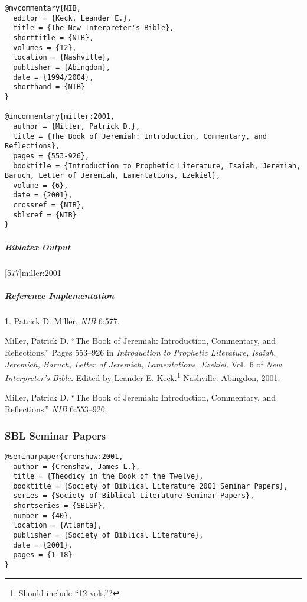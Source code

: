 \documentclass[a4paper]{article}
\newenvironment{biboutput}{%
  \subparagraph{Biblatex Output}
}{\color{black}}
\newenvironment{refimp}{%
  \subparagraph{Reference Implementation}
  \color{reference-colour}
  \rm
}{\par\color{black}}
\begin{document}
\begin{lstlisting}
@mvcommentary{NIB,
  editor = {Keck, Leander E.},
  title = {The New Interpreter's Bible},
  shorttitle = {NIB},
  volumes = {12},
  location = {Nashville},
  publisher = {Abingdon},
  date = {1994/2004},
  shorthand = {NIB}
}

@incommentary{miller:2001,
  author = {Miller, Patrick D.},
  title = {The Book of Jeremiah: Introduction, Commentary, and Reflections},
  pages = {553-926},
  booktitle = {Introduction to Prophetic Literature, Isaiah, Jeremiah, Baruch, Letter of Jeremiah, Lamentations, Ezekiel},
  volume = {6},
  date = {2001},
  crossref = {NIB},
  sblxref = {NIB}
}
\end{lstlisting}

\begin{biboutput}
  [577]{miller:2001}
  \toggletrue{fullbibrefs}
  \togglefalse{fullbibrefs}
\end{biboutput}

\begin{refimp}
  \hspace*{\bibindent}1. Patrick D. Miller, \emph{NIB} 6:577.

  \hangindent\bibindent Miller, Patrick D. “The Book of Jeremiah:
  Introduction, Commentary, and Reflections.” Pages 553–926 in
  \emph{Introduction to Prophetic Literature, Isaiah, Jeremiah, Baruch, Letter
  of Jeremiah, Lamentations, Ezekiel.} Vol.~6 of \emph{New Interpreter’s
  Bible.} Edited by Leander E. Keck.\footnote{Should include “12 vols.”?}
  Nashville: Abingdon, 2001.

  \hangindent\bibindent Miller, Patrick D. “The Book of Jeremiah:
  Introduction, Commentary, and Reflections.” \emph{NIB} 6:553–926.

\end{refimp}

\subsubsection{SBL Seminar Papers}

\begin{lstlisting}
@seminarpaper{crenshaw:2001,
  author = {Crenshaw, James L.},
  title = {Theodicy in the Book of the Twelve},
  booktitle = {Society of Biblical Literature 2001 Seminar Papers},
  series = {Society of Biblical Literature Seminar Papers},
  shortseries = {SBLSP},
  number = {40},
  location = {Atlanta},
  publisher = {Society of Biblical Literature},
  date = {2001},
  pages = {1-18}
}
\end{lstlisting}
\end{document}
